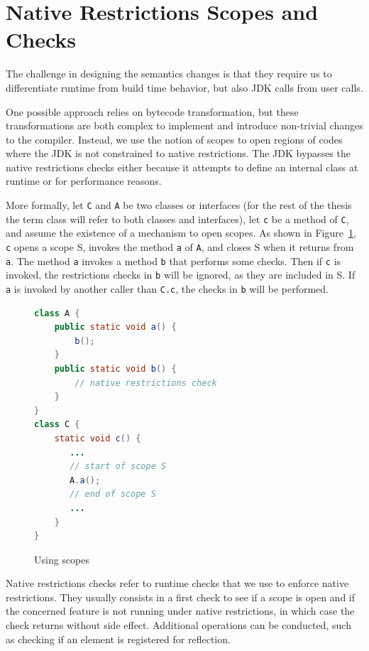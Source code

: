 \section{Native Restrictions Scopes and Checks}
The challenge in designing the semantics changes is that they require us to differentiate runtime from build time behavior, but also JDK calls from user calls.

One possible approach relies on bytecode transformation, but these transformations are both complex to implement and introduce non-trivial changes to the compiler. 
Instead, we use the notion of scopes to open regions of codes where the JDK is not constrained to native restrictions.
The JDK bypasses the native restrictions checks either because it attempts to define an internal class at runtime or for performance reasons.

More formally, let \verb|C| and \verb|A| be two classes or interfaces (for the rest of the thesis the term class will refer to both classes and interfaces), let \verb|c| be a method of \verb|C|, and assume the existence of a mechanism to open scopes. As shown in Figure~\ref{fig:scopes}, \verb|c| opens a scope S, invokes the method \verb|a| of \verb|A|, and closes S when it returns from \verb|a|.
The method \verb|a| invokes a method \verb|b| that performs some checks.
Then if \verb|c| is invoked, the restrictions checks in \verb|b| will be ignored, as they are included in S.
If \verb|a| is invoked by another caller than \verb|C.c|, the checks in \verb|b| will be performed.

\begin{figure}[ht]
    \centering
\begin{lstlisting}[language=Java]
class A {
    public static void a() {
        b(); 
    }
    public static void b() {
        // native restrictions check
    }
} 
class C {
    static void c() {
       ...
       // start of scope S
       A.a();
       // end of scope S
       ...
    }
}
\end{lstlisting}
    \caption{Using scopes}
    \label{fig:scopes}
\end{figure}

Native restrictions checks refer to runtime checks that we use to enforce native restrictions. They usually consists in a first check to see if a scope is open and if the concerned feature is not running under native restrictions, in which case the check returns without side effect. Additional operations can be conducted, such as checking if an element is registered for reflection. 

